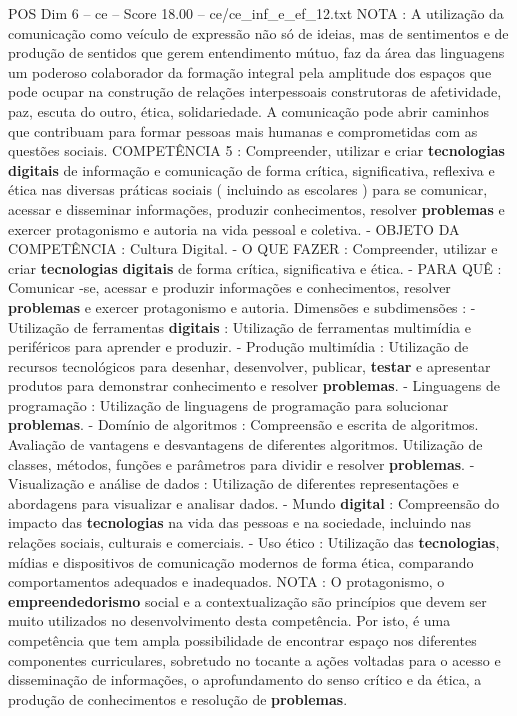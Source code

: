 \begin{textsample}{POS Dim 6 – ce – Score 18.00 – ce/ce\_inf\_e\_ef\_12.txt}
NOTA : A utilização da comunicação como veículo de expressão não só de ideias, mas de sentimentos e de produção de sentidos que gerem entendimento mútuo, faz da área das linguagens um poderoso colaborador da formação integral pela amplitude dos espaços que pode ocupar na construção de relações interpessoais construtoras de afetividade, paz, escuta do outro, ética, solidariedade.
A comunicação pode abrir caminhos que contribuam para formar pessoas mais humanas e comprometidas com as questões sociais.
COMPETÊNCIA 5 : Compreender, utilizar e criar \textbf{tecnologias} \textbf{digitais} de informação e comunicação de forma crítica, significativa, reflexiva e ética nas diversas práticas sociais ( incluindo as escolares ) para se comunicar, acessar e disseminar informações, produzir conhecimentos, resolver \textbf{problemas} e exercer protagonismo e autoria na vida pessoal e coletiva. - OBJETO DA COMPETÊNCIA : Cultura Digital. - O QUE FAZER : Compreender, utilizar e criar \textbf{tecnologias} \textbf{digitais} de forma crítica, significativa e ética. - PARA QUÊ : Comunicar -se, acessar e produzir informações e conhecimentos, resolver \textbf{problemas} e exercer protagonismo e autoria.
Dimensões e subdimensões : - Utilização de ferramentas \textbf{digitais} : Utilização de ferramentas multimídia e periféricos para aprender e produzir. - Produção multimídia : Utilização de recursos tecnológicos para desenhar, desenvolver, publicar, \textbf{testar} e apresentar produtos para demonstrar conhecimento e resolver \textbf{problemas}. - Linguagens de programação : Utilização de linguagens de programação para solucionar \textbf{problemas}. - Domínio de algoritmos : Compreensão e escrita de algoritmos.
Avaliação de vantagens e desvantagens de diferentes algoritmos.
Utilização de classes, métodos, funções e parâmetros para dividir e resolver \textbf{problemas}. - Visualização e análise de dados : Utilização de diferentes representações e abordagens para visualizar e analisar dados. - Mundo \textbf{digital} : Compreensão do impacto das \textbf{tecnologias} na vida das pessoas e na sociedade, incluindo nas relações sociais, culturais e comerciais. - Uso ético : Utilização das \textbf{tecnologias}, mídias e dispositivos de comunicação modernos de forma ética, comparando comportamentos adequados e inadequados.
NOTA : O protagonismo, o \textbf{empreendedorismo} social e a contextualização são princípios que devem ser muito utilizados no desenvolvimento desta competência.
Por isto, é uma competência que tem ampla possibilidade de encontrar espaço nos diferentes componentes curriculares, sobretudo no tocante a ações voltadas para o acesso e disseminação de informações, o aprofundamento do senso crítico e da ética, a produção de conhecimentos e resolução de \textbf{problemas}.

\end{textsample}
